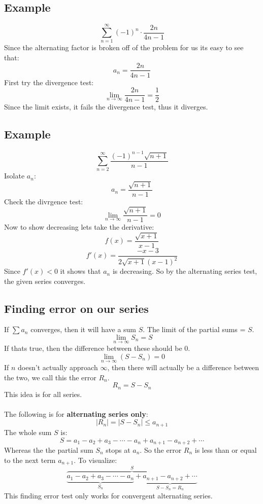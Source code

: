 \documentclass{article}
\begin{document}
    \subsection{Example}
        \[\sum_{n = 1}^{\infty} (-1)^n \cdot \frac{2n}{4n-1} \]
        Since the alternating factor is broken off of the problem for us its easy to see that:
        \[a_n = \frac{2n}{4n-1}\]
        First try the divergence test:
        \[\lim_{n \to \infty} \frac{2n}{4n-1} = \frac{1}{2}\]
        Since the limit exists, it fails the divergence test, thus it diverges.
        
    \subsection{Example}
        \[\sum_{n=2}^{\infty} \frac{(-1)^{n-1} \sqrt{n+1}}{n-1}\]
        Isolate \(a_n\):
        \[a_n = \frac{\sqrt{n+1}}{n-1}\]
        Check the divrgence test:
        \[\lim_{n \to \infty} \frac{\sqrt{n+1}}{n-1} = 0\]
        Now to show decreasing lets take the derivative:
        \[f(x) = \frac{\sqrt{x+1}}{x-1}\]
        \[f'(x) = \frac{-x-3}{2\sqrt{x+1}(x-1)^2}\]
        Since \(f'(x) < 0\) it shows that \(a_n\) is decreasing. So by the alternating series test, the given series converges.
    
    \subsection{Finding error on our series}
        If \(\sum a_n\) converges, then it will have a sum \(S\). The limit of the partial sums = \(S\).
        \[\lim_{n \to \infty}  S_n = S\]
        If thats true, then the difference between these should be 0.
        \[\lim_{n \to \infty} (S - S_n) = 0\]
        If \(n\) doesn't actually approach \(\infty\), then there will actually be a difference between the two, we call this the error \(R_n\).
        \[R_n = S - S_n\]
        This idea is for all series.\\
        \\
        The following is for \textbf{alternating series only}:
        \[|R_n| = |S - S_n| \leq a_{n+1}\]
        The whole sum \(S\) is:
        \[S=a_1 - a_2 + a_3 - \cdots - a_n + a_{n+1} - a_{n+2} + \cdots\]
        Whereas the the partial sum \(S_n\) stops at \(a_n\). So the error \(R_n\) is less than or equal to the next term \(a_{n+1}\).
        To visualize:
        \[\overbrace{\underbrace{a_1 - a_2 + a_3 - \cdots - a_n}_{S_n} + \underbrace{a_{n+1} - a_{n+2} + \cdots}_{S - S_n = R_n}}^{S} \]
        This finding error test only works for convergent alternating series.
        
\end{document}
